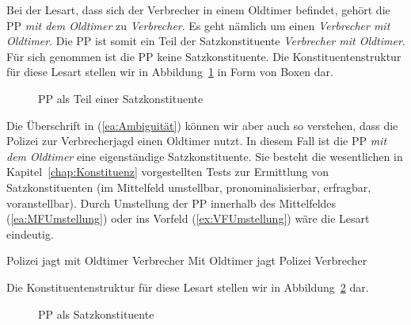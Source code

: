 Bei der Lesart, dass sich der Verbrecher in einem Oldtimer befindet, gehört die PP \textit{mit dem Oldtimer} zu \textit{Verbrecher}. Es geht nämlich um einen \textit{Verbrecher mit Oldtimer}. Die PP ist somit ein Teil der Satzkonstituente \textit{Verbrecher mit Oldtimer}. Für sich genommen ist die PP keine Satzkonstituente. Die Konstituentenstruktur für diese Lesart stellen wir in Abbildung~\ref{fig:PPkeineSatzkonst} in Form von Boxen dar.

\begin{figure}

\caption{\label{fig:PPkeineSatzkonst} PP als Teil einer Satzkonstituente}
\end{figure}%

Die Überschrift in (\ref{ea:Ambiguität}) können wir aber auch so verstehen, dass die Polizei zur Verbrecherjagd einen Oldtimer nutzt. In diesem Fall ist die PP \textit{mit dem Oldtimer} eine eigenständige Satzkonstituente. Sie besteht die wesentlichen in Kapitel~\ref{chap:Konstituenz} vorgestellten Tests zur Ermittlung von Satzkonstituenten (im Mittelfeld umstellbar, pronominalisierbar, erfragbar, voranstellbar). Durch Umstellung der PP innerhalb des Mittelfeldes (\ref{ea:MFUmstellung}) oder ins Vorfeld (\ref{ex:VFUmstellung}) wäre die Lesart eindeutig. 

\ea \label{ea:Desambiguierung}
\ea \label{ea:MFUmstellung} Polizei jagt mit Oldtimer Verbrecher
\ex \label{ex:VFUmstellung} Mit Oldtimer jagt Polizei Verbrecher
\z 
\z 

Die Konstituentenstruktur für diese Lesart stellen wir in Abbildung~\ref{fig:PPSatzkonst} dar. 

\begin{figure}

\caption{\label{fig:PPSatzkonst} PP als Satzkonstituente}
\end{figure}%

